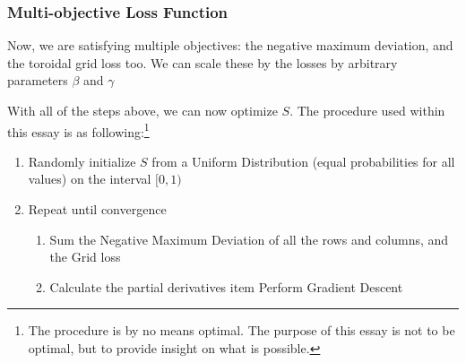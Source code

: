 \subsubsection{Multi-objective Loss Function}%
\label{ssub:multi_objective_loss_function}
Now, we are satisfying multiple objectives: the negative maximum deviation, and the toroidal grid loss too. We can scale these by the losses by arbitrary parameters $\beta$ and $\gamma$

With all of the steps above, we can now optimize $S$. The procedure used within this essay is as following:\footnote{The procedure is by no means optimal. The purpose of this essay is not to be optimal, but to provide insight on what is possible.}
\begin{enumerate}
    \item Randomly initialize $S$ from a Uniform Distribution (equal probabilities for all values) on the interval $[0,1)$
    \item Repeat until convergence
    \begin{enumerate}
    \item Sum the Negative Maximum Deviation of all the rows and columns, and the Grid loss
    \item Calculate the partial derivatives
    item Perform Gradient Descent
    \end{enumerate}
\end{enumerate}
